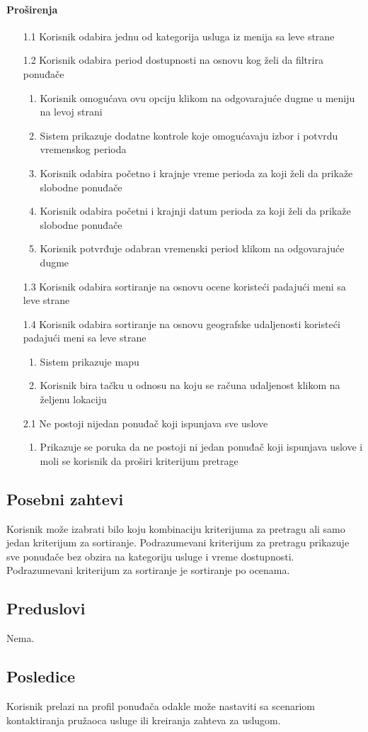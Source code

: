 \documentclass[a4paper,12pt]{report}
\begin{document}
			\paragraph*{Proširenja}
				\begin{enumerate}
					\item[1.1] Korisnik odabira jednu od kategorija usluga iz menija sa leve strane
						
					\item[1.2] Korisnik odabira period dostupnosti na osnovu kog želi da filtrira ponuđače
						\begin{enumerate}[noitemsep,topsep=-8pt]
							\item Korisnik omogućava ovu opciju klikom na odgovarajuće dugme u meniju na levoj strani
							\item Sistem prikazuje dodatne kontrole koje omogućavaju izbor i potvrdu vremenskog perioda
							\item Korisnik odabira početno i krajnje vreme perioda za koji želi da prikaže slobodne ponuđače
							\item Korisnik odabira početni i krajnji datum perioda za koji želi da prikaže slobodne ponuđače
							\item Korisnik potvrđuje odabran vremenski period klikom na odgovarajuće dugme
						\end{enumerate}
					\item[1.3] Korisnik odabira sortiranje na osnovu ocene koristeći padajući meni sa leve strane
						
					\item[1.4] Korisnik odabira sortiranje na osnovu geografske udaljenosti koristeći padajući meni sa leve strane
						\begin{enumerate}[noitemsep,topsep=-8pt]
							\item Sistem prikazuje mapu
							\item Korisnik bira tačku u odnosu na koju se računa udaljenost klikom na željenu lokaciju
						\end{enumerate}
					\item[2.1] Ne postoji nijedan ponuđač koji ispunjava sve uslove
						\begin{enumerate}[noitemsep,topsep=-8pt]
							\item Prikazuje se poruka da ne postoji ni jedan ponuđač koji ispunjava uslove i moli se korisnik da proširi kriterijum pretrage
						\end{enumerate}
				\end{enumerate}
		\subsection{Posebni zahtevi}
			Korisnik može izabrati bilo koju kombinaciju kriterijuma za pretragu ali samo jedan kriterijum za sortiranje.
			Podrazumevani kriterijum za pretragu prikazuje sve ponuđače bez obzira na kategoriju usluge i vreme dostupnosti.
			Podrazumevani kriterijum za sortiranje je sortiranje po ocenama.
		\subsection{Preduslovi}
			Nema.
		\subsection{Posledice}
			Korisnik prelazi na profil ponuđača odakle može nastaviti sa scenariom kontaktiranja pružaoca usluge ili kreiranja zahteva za uslugom.
\end{document}
